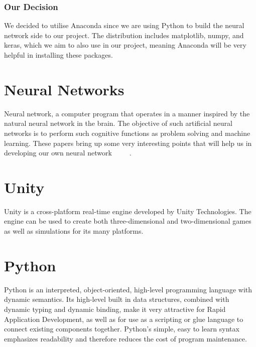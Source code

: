 \subsubsection{Our Decision}
We decided to utilise Anaconda since we are using Python to build the neural network side to our project. The distribution includes matplotlib, numpy, and keras, which we aim to also use in our project, meaning Anaconda will be very helpful in installing these packages.

\section{Neural Networks}
Neural network, a computer program that operates in a manner inspired by the natural neural network in the brain. The objective of such artificial neural networks is to perform such cognitive functions as problem solving and machine learning. These papers bring up some very interesting points that will help us in developing our own neural network ~\cite{koza1991genetic} ~\cite{specht1991general} ~\cite{krogh1995neural}.

\section{Unity}
Unity is a cross-platform real-time engine developed by Unity Technologies. The engine can be used to create both three-dimensional and two-dimensional games as well as simulations for its many platforms.

\section{Python}
Python is an interpreted, object-oriented, high-level programming language with dynamic semantics. Its high-level built in data structures, combined with dynamic typing and dynamic binding, make it very attractive for Rapid Application Development, as well as for use as a scripting or glue language to connect existing components together. Python's simple, easy to learn syntax emphasizes readability and therefore reduces the cost of program maintenance. 

